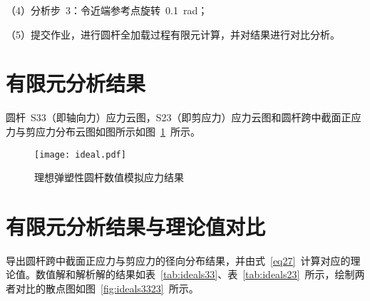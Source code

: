 （4）分析步~3：令近端参考点旋转~0.1~rad；

（5）提交作业，进行圆杆全加载过程有限元计算，并对结果进行对比分析。

\section{有限元分析结果}
圆杆~S33（即轴向力）应力云图，S23（即剪应力）应力云图和圆杆跨中截面正应力与剪应力分布云图如图所示如图~\ref{fig:ideal}~所示。
\begin{figure}[htbp]
    \centering
	\texttt{[image: ideal.pdf]}
    \caption{理想弹塑性圆杆数值模拟应力结果}
    \label{fig:ideal}
\end{figure}
\section{有限元分析结果与理论值对比}
导出圆杆跨中截面正应力与剪应力的径向分布结果，并由式~\eqref{eq27}~计算对应的理论值。数值解和解析解的结果如表~\ref{tab:ideals33}、表~\ref{tab:ideals23}~所示，绘制两者对比的散点图如图~\ref{fig:ideals3323}~所示。

